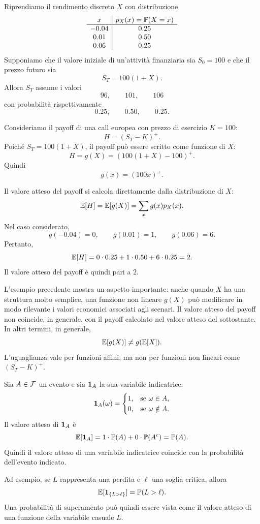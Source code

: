 \begin{example}
Riprendiamo il rendimento discreto $X$ con distribuzione
\[
\begin{array}{c|c}
x & p_X(x)=\mathbb{P}(X=x)\\
\hline
-0.04 & 0.25\\
 0.01 & 0.50\\
 0.06 & 0.25
\end{array}
\]
Supponiamo che il valore iniziale di un'attivit\`{a} finanziaria sia $S_0=100$ e
che il prezzo futuro sia
\[
S_T=100(1+X).
\]
Allora $S_T$ assume i valori
\[
96,\qquad 101,\qquad 106
\]
con probabilit\`{a} rispettivamente
\[
0.25,\qquad 0.50,\qquad 0.25.
\]

Consideriamo il payoff di una call europea con prezzo di esercizio $K=100$:
\[
H=(S_T-K)^+.
\]
Poich\'{e} $S_T=100(1+X)$, il payoff pu\`{o} essere scritto come funzione di
$X$:
\[
H=g(X)=\left(100(1+X)-100\right)^+.
\]
Quindi
\[
g(x)=(100x)^+.
\]

Il valore atteso del payoff si calcola direttamente dalla distribuzione di $X$:
\[
\mathbb{E}[H]
=
\mathbb{E}[g(X)]
=
\sum_x g(x)p_X(x).
\]
Nel caso considerato,
\[
g(-0.04)=0,
\qquad
g(0.01)=1,
\qquad
g(0.06)=6.
\]
Pertanto,
\[
\mathbb{E}[H]
=
0\cdot 0.25+1\cdot 0.50+6\cdot 0.25
=
2.
\]
Il valore atteso del payoff \`{e} quindi pari a $2$.
\end{example}

L'esempio precedente mostra un aspetto importante: anche quando $X$ ha una
struttura molto semplice, una funzione non lineare $g(X)$ pu\`{o} modificare in
modo rilevante i valori economici associati agli scenari. Il valore atteso del
payoff non coincide, in generale, con il payoff calcolato nel valore atteso del
sottostante. In altri termini, in generale,
\[
\mathbb{E}[g(X)]\neq g(\mathbb{E}[X]).
\]
L'uguaglianza vale per funzioni affini, ma non per funzioni non lineari come
$(S_T-K)^+$.

\begin{example}
Sia $A\in\mathcal{F}$ un evento e sia $\mathbf{1}_A$ la sua variabile indicatrice:
\[
\mathbf{1}_A(\omega)=
\begin{cases}
1, & \mbox{se }\omega\in A,\\
0, & \mbox{se }\omega\notin A.
\end{cases}
\]
Il valore atteso di $\mathbf{1}_A$ \`{e}
\[
\mathbb{E}[\mathbf{1}_A]
=
1\cdot \mathbb{P}(A)+0\cdot \mathbb{P}(A^c)
=
\mathbb{P}(A).
\]
Quindi il valore atteso di una variabile indicatrice coincide con la probabilit\`{a}
dell'evento indicato.

Ad esempio, se $L$ rappresenta una perdita e $\ell$ una soglia critica, allora
\[
\mathbb{E}[\mathbf{1}_{\{L>\ell\}}]
=
\mathbb{P}(L>\ell).
\]
Una probabilit\`{a} di superamento pu\`{o} quindi essere vista come il valore
atteso di una funzione della variabile casuale $L$.
\end{example}

